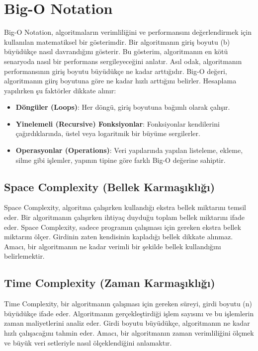 \section{Big-O Notation}

Big-O Notation, algoritmaların verimliliğini ve performansını değerlendirmek için kullanılan matematiksel bir gösterimdir. Bir algoritmanın giriş boyutu (b) büyüdükçe nasıl davrandığını gösterir. Bu gösterim, algoritmanın en kötü senaryoda nasıl bir performans sergileyeceğini anlatır. Asıl odak, algoritmanın performansının giriş boyutu büyüdükçe ne kadar arttığıdır. Big-O değeri, algoritmanın giirş boyutuna göre ne kadar hızlı arttığını belirler. Hesaplama yapılırken şu faktörler dikkate alınır:

\begin{itemize}
    \item \textbf{Döngüler (Loops)}: Her döngü, giriş boyutuna bağımlı olarak çalışır.
    \item \textbf{Yinelemeli (Recursive) Fonksiyonlar}: Fonksiyonlar kendilerini çağırdıklarında, üstel veya logaritmik bir büyüme sergilerler.
    \item \textbf{Operasyonlar (Operations)}: Veri yapılarında yapılan listeleme, ekleme, silme gibi işlemler, yapının tipine göre farklı Big-O değerine sahiptir.
\end{itemize}

\subsection{Space Complexity (Bellek Karmaşıklığı)}

Space Complexity, algoritma çalışırken kullandığı ekstra bellek miktarını temsil eder. Bir algoritmanın çalışırken ihtiyaç duyduğu toplam bellek miktarını ifade eder. Space Complexity, sadece programın çalışması için gereken ekstra bellek miktarını ölçer. Girdinin zaten kendisinin kapladığı bellek dikkate alınmaz. Amacı, bir algoritmanın ne kadar verimli bir şekilde bellek kullandığını belirlemektir.

\subsection{Time Complexity (Zaman Karmaşıklığı)}

Time Complexity, bir algoritmanın çalışması için gereken süreyi, girdi boyutu (n) büyüdükçe ifade eder. Algoritmanın gerçekleştirdiği işlem sayısını ve bu işlemlerin zaman maliyetlerini analiz eder. Girdi boyutu büyüdükçe, algoritmanın ne kadar hızlı çalışacağını tahmin eder. Amacı, bir algoritmanın zaman verimliliğini ölçmek ve büyük veri setleriyle nasıl ölçeklendiğini anlamaktır.


